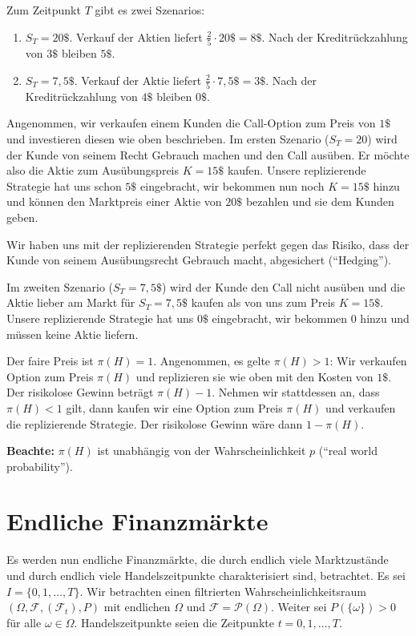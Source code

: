 \documentclass[a4paper,twoside,DIV15,BCOR12mm]{scrbook}
\newcommand{\cF}{\mathcal F}
\begin{document}
\begin{beispiel}
Zum Zeitpunkt $T$ gibt es zwei Szenarios:
\begin{enumerate}
\item $S_T=20\$$. Verkauf der Aktien liefert $\frac 25 \cdot 20\$ = 8\$$. Nach der Kreditrückzahlung von $3\$$ bleiben $5\$$.
\item $S_T=7,5\$$. Verkauf der Aktie liefert $\frac 25 \cdot 7,5\$ = 3\$$. Nach der Kreditrückzahlung von $4\$$ bleiben $0\$$.
\end{enumerate}

Angenommen, wir verkaufen einem Kunden die Call-Option zum Preis von $1\$$ und investieren diesen wie oben beschrieben. Im ersten Szenario ($S_T=20$) wird der Kunde von seinem Recht Gebrauch machen und den Call ausüben. Er möchte also die Aktie zum Ausübungspreis $K=15\$$ kaufen. Unsere replizierende Strategie hat uns schon $5\$$ eingebracht, wir bekommen nun noch $K=15\$$ hinzu und können den Marktpreis einer Aktie von $20\$$ bezahlen und sie dem Kunden geben.

Wir haben uns mit der replizierenden Strategie perfekt gegen das Risiko, dass der Kunde  von seinem Ausübungsrecht Gebrauch macht, abgesichert (“Hedging”).

Im zweiten Szenario ($S_T=7,5\$$) wird der Kunde den Call nicht ausüben und die Aktie lieber am Markt für $S_T=7,5\$$ kaufen als von uns zum Preis $K=15\$$. Unsere replizierende Strategie hat uns $0\$$ eingebracht, wir bekommen 0 hinzu und müssen keine Aktie liefern.

Der faire Preis ist $\pi(H)=1$.
Angenommen, es gelte $\pi(H)>1$: Wir verkaufen Option zum Preis $\pi(H)$ und replizieren sie wie oben mit den Kosten von $1\$$. Der risikolose Gewinn beträgt $\pi(H) - 1$. Nehmen wir stattdessen an, dass $\pi(H)<1$ gilt, dann kaufen wir eine Option zum Preis $\pi(H)$ und verkaufen die replizierende Strategie. Der risikolose Gewinn wäre dann $1-\pi(H)$.

\textbf{Beachte:} $\pi(H)$ ist unabhängig von der Wahrscheinlichkeit $p$ (“real world probability”).
\end{beispiel}

\section{Endliche Finanzmärkte}
\label{sec:2.3}

Es werden nun endliche Finanzmärkte, die durch endlich viele Marktzustände und durch endlich viele Handelszeitpunkte charakterisiert sind, betrachtet. Es sei $I=\{0, 1,\ldots,T\}$. Wir betrachten einen filtrierten Wahrscheinlichkeitsraum $(\Omega,\cF,(\cF_t),P)$ mit endlichen $\Omega$ und $\cF=\mathcal P(\Omega)$. Weiter sei $P(\{\omega\})>0$ für alle $\omega\in\Omega$. Handelszeitpunkte seien die Zeitpunkte $t=0, 1,\ldots,T$.
\end{document}
